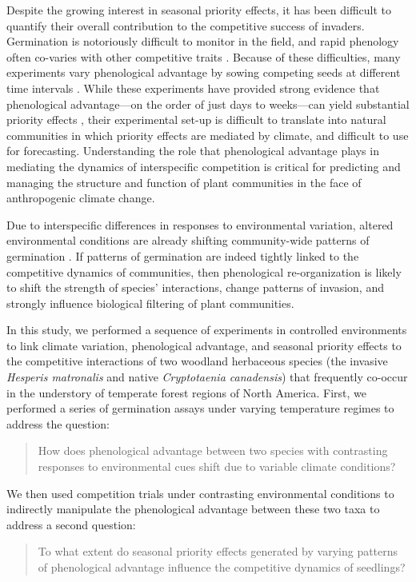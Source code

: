 \documentclass{article}[11pt]
\begin{document}
Despite the growing interest in seasonal priority effects, it has been difficult to quantify their overall contribution to the competitive success of invaders. Germination is notoriously difficult to monitor in the field, and rapid phenology often co-varies with other competitive traits \citep{Dickson2012,Milbau:2003vt,HAO:2009vh}. %
Because of these difficulties, many experiments vary phenological advantage by sowing competing seeds at different time intervals \citep{Young:2017aa}. While these experiments have provided strong evidence that phenological advantage---on the order of just days to weeks---can yield substantial priority effects \citep{Weidlich:2020aa}, their experimental set-up is difficult to translate into natural communities in which priority effects are mediated by climate, and difficult to use for forecasting. %
Understanding the role that phenological advantage plays in mediating the dynamics of interspecific competition is critical for predicting and managing the structure and function of plant communities in the face of anthropogenic climate change. 

Due to interspecific differences in responses to environmental variation, altered environmental conditions are already shifting community-wide patterns of germination \citep{Walck2011}. If patterns of germination are indeed tightly linked to the competitive dynamics of communities, then phenological re-organization is likely to shift the strength of species' interactions, change patterns of invasion, and strongly influence biological filtering of plant communities. 

In this study, we performed a sequence of experiments in controlled environments to link climate variation, phenological advantage, and seasonal priority effects to the competitive interactions of two woodland herbaceous species (the invasive \textit{Hesperis matronalis} and native \textit{Cryptotaenia canadensis}) that frequently co-occur in the understory of temperate forest regions of North America. First, we performed a series of germination assays under varying temperature regimes to address the question: 
\begin{quote}How does phenological advantage between two species with contrasting responses to environmental cues shift due to variable climate conditions?\end{quote}
We then used competition trials under contrasting environmental conditions to indirectly manipulate the phenological advantage between these two taxa to address a second question: \begin{quote}To what extent do seasonal priority effects generated by varying patterns of phenological advantage influence the competitive dynamics of seedlings?\end{quote}
\end{document}
